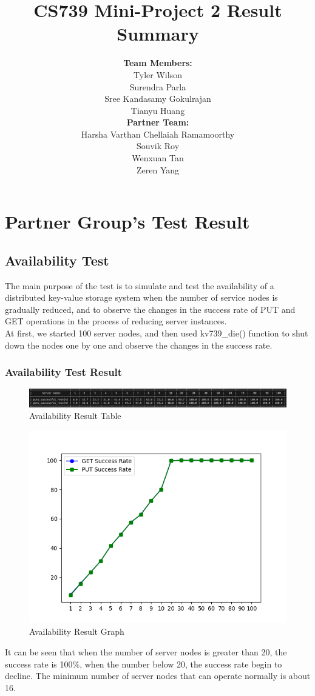\documentclass{article}
\title{\textbf{CS739 Mini-Project 2 Result Summary}}
\author{
    \begin{minipage}[t]{0.45\textwidth}
        \begin{flushleft}
            \textbf{Team Members:} \\
            Tyler Wilson \\ 
            Surendra Parla \\ 
            Sree Kandasamy Gokulrajan \\ 
            Tianyu Huang
        \end{flushleft}
    \end{minipage}
    \hfill
    \begin{minipage}[t]{0.45\textwidth}
        \begin{flushright}
            \textbf{Partner Team:} \\
            Harsha Varthan Chellaiah Ramamoorthy \\ 
            Souvik Roy \\ 
            Wenxuan Tan \\ 
            Zeren Yang
        \end{flushright}
    \end{minipage}
}
\begin{document}
\maketitle
\section{Partner Group's Test Result}
\subsection{Availability Test}
The main purpose of the test is to simulate and test the availability of a distributed key-value storage system when the number of service nodes is gradually reduced, and to observe the changes in the success rate of PUT and GET operations in the process of reducing server instances.\\
At first, we started 100 server nodes, and then used kv739\_die() function to shut down the nodes one by one and observe the changes in the success rate.
\subsubsection{Availability Test Result}
\begin{figure}[H]  
    \centering
    \includegraphics[width=1\textwidth]{ptn_availability_output_table.png}  %
    \caption{Availability Result Table}
\end{figure}
\begin{figure}[H]  
    \centering
    \includegraphics[width=1\textwidth]{ptn_availability_output_plot.png}  %
    \caption{Availability Result Graph}
\end{figure}
It can be seen that when the number of server nodes is greater than 20, the success rate is 100\%, when the number below 20, the success rate begin to decline. The minimum number of server nodes that can operate normally is about 16.
\end{document}
